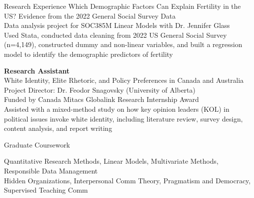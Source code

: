 \documentclass[
	11pt, %
]{resume} %
\begin{document}
\begin{rSection}{Research Experience}
  Which Demographic Factors Can Explain Fertility in the US? Evidence from the 2022 General Social Survey Data\\
\textbullet\enspace Data analysis project for SOC385M Linear Models with Dr. Jennifer Glass\\    
\textbullet\enspace Used Stata, conducted data cleaning from 2022 US General Social Survey (n=4,149), constructed dummy and non-linear variables, and built a regression model to identify the demographic predictors of fertility

    \textbf{Research Assistant}\\ 
     White Identity, Elite Rhetoric, and Policy Preferences in Canada and Australia\\
\textbullet\enspace Project Director: Dr. Feodor Snagovsky (University of Alberta)\\    
\textbullet\enspace Funded by Canada Mitacs Globalink Research Internship Award\\
\textbullet\enspace Assisted with a mixed-method study on how key opinion leaders (KOL) in political issues invoke white identity, including literature review, survey design, content analysis, and report writing


	
\end{rSection}

\begin{rSection}{Graduate Coursework}

Quantitative Research Methods,  Linear Models,  Multivariate Methods,  Responsible Data Management\\
Hidden Organizations, Interpersonal Comm Theory, Pragmatism and Democracy, Supervised Teaching Comm

\end{rSection}

\end{document}
